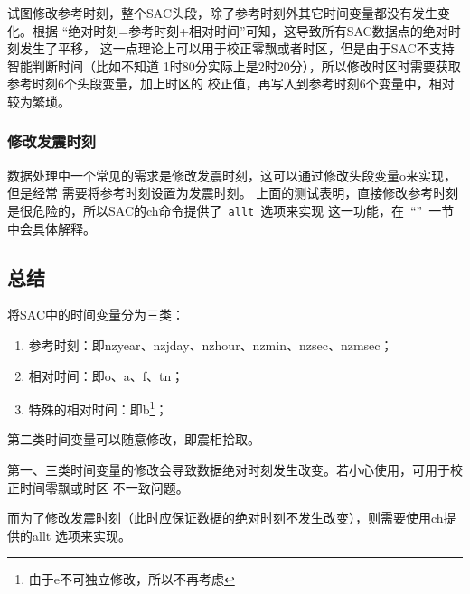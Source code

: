 试图修改参考时刻，整个SAC头段，除了参考时刻外其它时间变量都没有发生变化。根据
``绝对时刻=参考时刻+相对时间''可知，这导致所有SAC数据点的绝对时刻发生了平移，
这一点理论上可以用于校正零飘或者时区，但是由于SAC不支持智能判断时间（比如不知道
1时80分实际上是2时20分），所以修改时区时需要获取参考时刻6个头段变量，加上时区的
校正值，再写入到参考时刻6个变量中，相对较为繁琐。

\subsubsection{修改发震时刻}
数据处理中一个常见的需求是修改发震时刻，这可以通过修改头段变量o来实现，但是经常
需要将参考时刻设置为发震时刻。
上面的测试表明，直接修改参考时刻是很危险的，所以SAC的ch命令提供了~\verb+allt+~选项来实现
这一功能，在~``''~一节中会具体解释。

\subsection{总结}
将SAC中的时间变量分为三类：
\begin{enumerate}
\item 参考时刻：即nzyear、nzjday、nzhour、nzmin、nzsec、nzmsec；
\item 相对时间：即o、a、f、tn；
\item 特殊的相对时间：即b\footnote{由于e不可独立修改，所以不再考虑}；
\end{enumerate}

第二类时间变量可以随意修改，即震相拾取。

第一、三类时间变量的修改会导致数据绝对时刻发生改变。若小心使用，可用于校正时间零飘或时区
不一致问题。

而为了修改发震时刻（此时应保证数据的绝对时刻不发生改变），则需要使用ch提供的allt
选项来实现。

